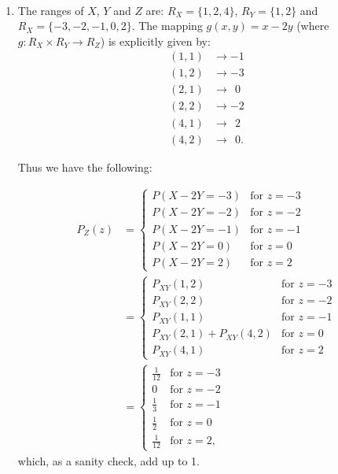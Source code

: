 \begin{problem}{2} $ $
\begin{enumerate}

\item The ranges of $X$, $Y$ and $Z$ are: $R_X=\{1, 2, 4 \}$, $R_Y=\{1, 2\}$ and  $R_X=\{-3, -2, -1, 0, 2\}$.  The mapping $g(x, y)=x-2y$ (where $g:R_X \times R_Y \rightarrow R_Z$) is explicitly given by:
\begin{align*}
(1, 1)& \rightarrow -1 \\
(1, 2)& \rightarrow -3 \\
(2, 1)& \rightarrow ~~0 \\
(2, 2)& \rightarrow -2 \\
(4, 1)& \rightarrow ~~2 \\
(4, 2)& \rightarrow ~~0.
\end{align*}

Thus we have the following:

	\begin{align*}  
  P_Z(z) &= \begin{cases}
                                  P(X-2Y=-3)& \text{for $z = -3$} \\
                                  P(X-2Y=-2)& \text{for $z = -2$} \\
                                  P(X-2Y=-1)& \text{for $z = -1$} \\
                                  P(X-2Y=0)& \text{for $z = 0$} \\
                                  P(X-2Y=2)& \text{for $z = 2$} 
       \end{cases} \\
&= \begin{cases}
                                  P_{XY}(1, 2) & \text{for $z = -3$} \\
                                  P_{XY}(2, 2) & \text{for $z = -2$} \\
                                  P_{XY}(1, 1) & \text{for $z = -1$} \\
                                  P_{XY}(2, 1)+P_{XY}(4, 2) & \text{for $z = 0$} \\
                                  P_{XY}(4, 1) & \text{for $z = 2$} 
       \end{cases}\\
      & = \begin{cases}
                                  \frac{1}{12} & \text{for $z = -3$} \\
                                  0 & \text{for $z = -2$} \\
                                  \frac{1}{3} & \text{for $z = -1$} \\
                                  \frac{1}{2} & \text{for $z = 0$} \\
                                  \frac{1}{12} & \text{for $z = 2$},
		\end{cases}
\end{align*}
which, as a sanity check, add up to 1.


\end{enumerate}
\end{problem}
